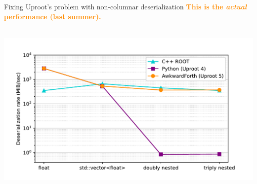 \documentclass[aspectratio=169]{beamer}
\begin{document}
\begin{frame}{Fixing Uproot's problem with non-columnar deserialization}
\vspace{0.25 cm}
\textcolor{darkorange}{\bf \centering This is the {\it actual} performance (last summer).}

\mbox{ } \hfill \includegraphics[width=0.9\linewidth]{PLOTS/awkwardforth-in-uproot-performance.pdf} \hfill \mbox{ }
\end{frame}
\end{document}
